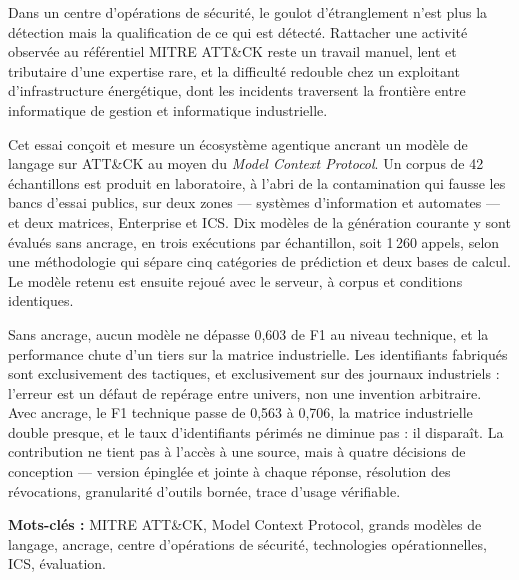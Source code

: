 
\label{chap:resume}

Dans un centre d'opérations de sécurité, le goulot d'étranglement n'est plus la
détection mais la qualification de ce qui est détecté. Rattacher une activité
observée au référentiel MITRE ATT\&CK reste un travail manuel, lent et
tributaire d'une expertise rare, et la difficulté redouble chez un exploitant
d'infrastructure énergétique, dont les incidents traversent la frontière entre
informatique de gestion et informatique industrielle.

Cet essai conçoit et mesure un écosystème agentique ancrant un modèle de langage
sur ATT\&CK au moyen du \emph{Model Context Protocol}. Un corpus de
42 échantillons est produit en laboratoire, à l'abri de la contamination qui
fausse les bancs d'essai publics, sur deux zones --- systèmes d'information et
automates --- et deux matrices, Enterprise et ICS. Dix modèles de la génération
courante y sont évalués sans ancrage, en trois exécutions par échantillon, soit
1\,260 appels, selon une méthodologie qui sépare cinq catégories de prédiction
et deux bases de calcul. Le modèle retenu est ensuite rejoué avec le serveur, à
corpus et conditions identiques.

Sans ancrage, aucun modèle ne dépasse 0,603 de F1 au niveau technique, et la
performance chute d'un tiers sur la matrice industrielle. Les identifiants
fabriqués sont exclusivement des tactiques, et exclusivement sur des journaux
industriels : l'erreur est un défaut de repérage entre univers, non une
invention arbitraire. Avec ancrage, le F1 technique passe de 0,563 à 0,706, la
matrice industrielle double presque, et le taux d'identifiants périmés ne
diminue pas : il disparaît. La contribution ne tient pas à l'accès à une source,
mais à quatre décisions de conception --- version épinglée et jointe à chaque
réponse, résolution des révocations, granularité d'outils bornée, trace d'usage
vérifiable.

\vspace{1em}
\noindent\textbf{Mots-clés :} MITRE ATT\&CK, Model Context Protocol, grands
modèles de langage, ancrage, centre d'opérations de sécurité, technologies
opérationnelles, ICS, évaluation.

